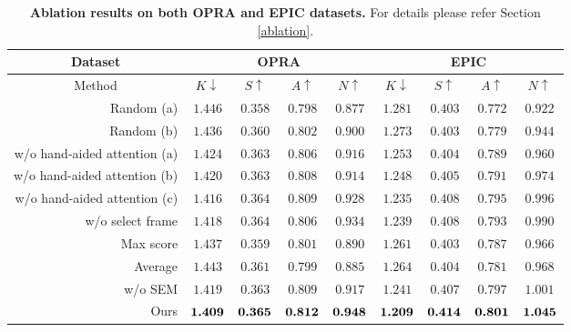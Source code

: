 \documentclass[journal,twoside]{IEEEtran}
\begin{document}
\begin{table*}[t]
\caption{\textbf{Ablation results on both OPRA \cite{demo2vec2018cvpr} and EPIC \cite{Damen2018EPICKITCHENS} datasets.} For details please refer Section \ref{ablation}.}
  \label{Table:5}
  \begin{center}
  \small
  \renewcommand{\arraystretch}{1.}
  \renewcommand{\tabcolsep}{12.1pt}
  \begin{tabular}{r|cccc|cccc}
    \hline\toprule
    \multicolumn{1}{c|}{\textbf{Dataset}} & \multicolumn{4}{c|}{\textbf{OPRA} \cite{demo2vec2018cvpr}} & \multicolumn{4}{c}{\textbf{EPIC} \cite{Damen2018EPICKITCHENS}} \\ 
    \hline
    \multicolumn{1}{c|}{Method} & \emph{$K\downarrow$} & \emph{$S\uparrow$} & \emph{$A\uparrow$} & \emph{$N\uparrow$} & \emph{$K\downarrow$} & \emph{$S\uparrow$} & \emph{$A\uparrow$} & \emph{$N\uparrow$} \\ 
    \hline
    Random (a) & $1.446$ & $0.358$ & $0.798$	& $0.877$ & $1.281$ &	$0.403$ &	 $0.772$ & $0.922$ \\
    Random (b) & $1.436$ & $0.360$ & $0.802$ & $0.900$ & $1.273$ &	$0.403$ &	 $0.779$ & $0.944$ \\
    w/o hand-aided attention (a) & $1.424$ &	$0.363$	& $0.806$ &	$0.916$ & $1.253$ & $0.404$	 & $0.789$ &	$0.960$ \\
    w/o hand-aided attention (b) & $1.420$ & $0.363$ &	$0.808$ & $0.914$ & $1.248$	 &  $0.405$ & $0.791$ & $0.974$  \\
    w/o hand-aided attention (c) & $1.416$ & $0.364$ & $0.809$ & $0.928$ & $1.235$ & $0.408$	& $0.795$ &	$0.996$   \\
    w/o select frame & $1.418$ & $0.364$ & $0.806$ & $0.934$ & $1.239$ & $0.408$ & $0.793$ & $0.990$ \\
    \hline
    Max score   & $1.437$ & $0.359$ & $0.801$ & $0.890$ & $1.261$ & $0.403$ & $0.787$ & $0.966$ \\
    Average    & $1.443$ & $0.361$ & $0.799$ & $0.885$ & $1.264$ & $0.404$ & $0.781$ & $0.968$ \\
    \hline
    w/o SEM & $1.419$ &	$0.363$	& $0.809$ & 	$0.917$ & $1.241$ & $0.407$ &	$0.797$ & $1.001$ \\
    \hline
    \rowcolor{mygray}
    Ours & $\normalsize\textbf{1.409}$ &	$\normalsize\textbf{0.365}$ & $\normalsize\textbf{0.812}$ & $\normalsize\textbf{0.948}$ & $\normalsize\textbf{1.209}$ & $\normalsize\textbf{0.414}$ & $\normalsize\textbf{0.801}$ & $\normalsize\textbf{1.045}$    \\
    \hline\bottomrule
    \end{tabular}
    \end{center}
 \end{table*}
\end{document}
